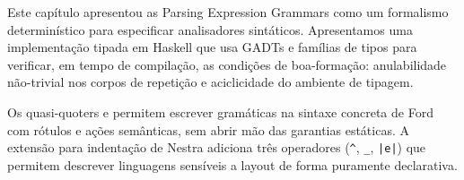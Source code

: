   Este capítulo apresentou as Parsing Expression Grammars como um
  formalismo determinístico para especificar analisadores sintáticos.
  Apresentamos uma implementação tipada em Haskell que usa GADTs e
  famílias de tipos para verificar, em tempo de compilação, as
  condições de boa-formação: anulabilidade não-trivial nos corpos de
  repetição e aciclicidade do ambiente de tipagem.

  Os quasi-quoters  e  permitem
  escrever gramáticas na sintaxe concreta de Ford com rótulos e ações
  semânticas, sem abrir mão das garantias estáticas. A extensão para
  indentação de Nestra adiciona três operadores (\texttt{\^{}},
  \texttt{\_}, \texttt{|e|}) que permitem descrever linguagens
  sensíveis a layout de forma puramente declarativa.
